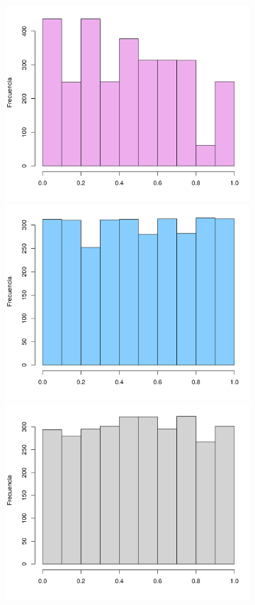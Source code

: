 \documentclass[12pt]{article}
\begin{document}
	\begin{figure}
		\begin{subfigure}{\textwidth}
			\centering
			\includegraphics[scale=0.34]{hist_5-11-43-97.png}
			\includegraphics[scale=0.34]{hist_5-59-43-97.png}
			\includegraphics[scale=0.34]{hist_5-613-919-857.png}

\end{subfigure}
\end{figure}
\end{document}
